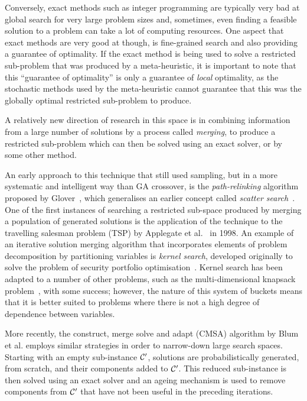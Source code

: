 \documentclass[journal]{IEEEtran}
\begin{document}
Conversely, exact methods such as integer programming are typically very bad at global search for very large problem sizes and, sometimes, even finding a feasible solution to a problem can take a lot of computing resources. One aspect that exact methods are very good at though, is fine-grained search and also providing a guarantee of optimality. If the exact method is being used to solve a restricted sub-problem that was produced by a meta-heuristic, it is important to note that this ``guarantee of optimality'' is only a guarantee of \emph{local} optimality, as the stochastic methods used by the meta-heuristic cannot guarantee that this was the globally optimal restricted sub-problem to produce.

A relatively new direction of research in this space is in combining information from a large number of solutions by a process called \emph{merging}, to produce a restricted sub-problem which can then be solved using an exact solver, or by some other method. 

An early approach to this technique that still used sampling, but in a more systematic and intelligent way than GA crossover, is the \emph{path-relinking} algorithm proposed by Glover~\cite{path-relinking}, which generalises an earlier concept called \emph{scatter search}~\cite{scatter-search}. One of the first instances of searching a restricted sub-space produced by merging a population of generated solutions is the application of the technique to the travelling salesman problem (TSP) by Applegate et al.~\cite{merge-tsp} in 1998. An example of an iterative solution merging algorithm that incorporates elements of problem decomposition by partitioning variables is \emph{kernel search}, developed originally to solve the problem of security portfolio optimisation~\cite{kernel1}. Kernel search has been adapted to a number of other problems, such as the multi-dimensional knapsack problem~\cite{kernel2}, with some success; however, the nature of this system of buckets means that it is better suited to problems where there is not a high degree of dependence between variables.

More recently, the construct, merge solve and adapt (CMSA) algorithm by Blum et al. \cite{cmsa} employs similar strategies in order to narrow-down large search spaces. Starting with an empty sub-instance $\S{C}^\prime$, solutions are probabilistically generated, from scratch, and their components added to $\S{C}^\prime$. This reduced sub-instance is then solved using an exact solver and an ageing mechanism is used to remove components from $\S{C}^\prime$ that have not been useful in the preceding iterations.
\end{document}
